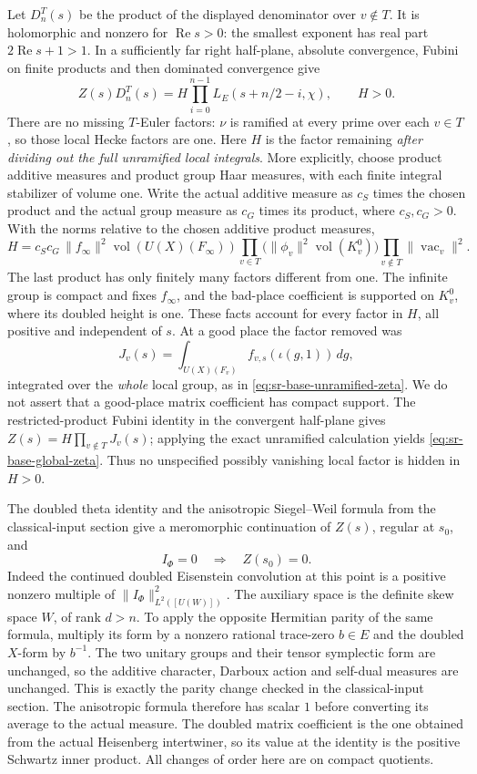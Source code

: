 Let \(D^T_n(s)\) be the product of the displayed denominator
over \(v\notin T\). It is holomorphic and nonzero for
\(\operatorname{Re}s>0\): the smallest exponent has real
part \(2\operatorname{Re}s+1>1\).
In a sufficiently far right half-plane, absolute convergence,
Fubini on finite products and then dominated convergence give
\[
 Z(s)D^T_n(s)
      =H\prod_{i=0}^{n-1}L_E(s+n/2-i,\chi),\qquad H>0.
\tag{****}\label{eq:sr-base-global-zeta}
\]
There are no missing \(T\)-Euler factors: \(\nu\) is ramified
at every prime over each \(v\in T\), so those local Hecke
factors are one. Here \(H\) is the factor remaining \emph{after dividing
out the full unramified local integrals}. More explicitly,
choose product additive measures and product group Haar
measures, with each finite integral stabilizer of volume
one. Write the actual additive measure as \(c_S\) times
the chosen product and the actual group measure as \(c_G\)
times its product, where \(c_S,c_G>0\). With the norms
relative to the chosen additive product measures,
\[
 H=c_Sc_G\,\|f_\infty\|^2
          \operatorname{vol}(U(X)(F_\infty))
       \prod_{v\in T}\!
            \bigl(\|\phi_v\|^2\operatorname{vol}(K_v^0)\bigr)
       \prod_{v\notin T}\|\operatorname{vac}_v\|^2 .
\]
The last product has only finitely many factors different
from one. The infinite group is compact and fixes
\(f_\infty\), and the bad-place coefficient is supported
on \(K_v^0\), where its doubled height is one.
These facts account for every factor in \(H\), all positive
and independent of \(s\). At a good place the factor removed
was
\[
             J_v(s)=\int_{U(X)(F_v)}
                       f_{v,s}(\iota(g,1))\,dg ,
\]
integrated over the \emph{whole} local group, as in
\eqref{eq:sr-base-unramified-zeta}. We do not assert that
a good-place matrix coefficient has compact support.
The restricted-product Fubini identity in the convergent
half-plane gives
\(Z(s)=H\prod_{v\notin T}J_v(s)\); applying the exact
unramified calculation yields
\eqref{eq:sr-base-global-zeta}. Thus no unspecified
possibly vanishing local factor is hidden in \(H>0\).

The doubled theta identity and the anisotropic Siegel--Weil
formula from the classical-input section give a meromorphic
continuation of \(Z(s)\), regular at \(s_0\), and
\[
       I_\Phi=0\quad\Longrightarrow\quad Z(s_0)=0.
\]
Indeed the continued doubled Eisenstein convolution at this
point is a positive nonzero multiple of
\(\|I_\Phi\|^2_{L^2([U(W)])}\).
The auxiliary space is the definite skew space \(W\), of
rank \(d>n\). To apply the opposite Hermitian parity of
the same formula, multiply its form by a nonzero rational
trace-zero \(b\in E\) and the doubled \(X\)-form by \(b^{-1}\).
The two unitary groups and their tensor symplectic form
are unchanged, so the additive character, Darboux action
and self-dual measures are unchanged. This is exactly the
parity change checked in the classical-input section.
The anisotropic formula therefore has scalar \(1\) before
converting its average to the actual measure.
The doubled matrix coefficient is the one obtained from
the actual Heisenberg intertwiner, so its value at the
identity is the positive Schwartz inner product.
All changes of order here are on compact quotients.

